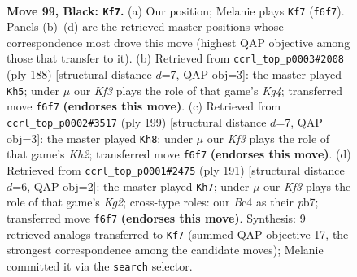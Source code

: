 \documentclass[11pt]{article}
\begin{document}
\clearpage

\begin{figure}[p]\centering
\begin{subfigure}{0.46\textwidth}\centering
\resizebox{\linewidth}{!}{%
\newchessgame
\chessboard[
  setfen={8/7K/5k2/5p2/2b2P2/8/8/8 b - - 13 99},
  showmover=false,
  pgfstyle=straightmove, color=movearrow, markmove={f6-f7}
]}
\caption{}
\end{subfigure}\hfill
\begin{subfigure}{0.46\textwidth}\centering
\resizebox{\linewidth}{!}{%
\newchessgame
\chessboard[
  setfen={3r4/1B4k1/7p/8/6KP/8/8/8 w - - 66 95},
  showmover=false,
  pgfstyle=straightmove, color=movearrow, markmove={g4-h5}
]}
\caption{}
\end{subfigure}
\\[4pt]
\begin{subfigure}{0.46\textwidth}\centering
\resizebox{\linewidth}{!}{%
\newchessgame
\chessboard[
  setfen={5K2/7k/6p1/8/2B4P/7P/8/8 b - - 44 100},
  showmover=false,
  pgfstyle=straightmove, color=movearrow, markmove={h7-h8}
]}
\caption{}
\end{subfigure}\hfill
\begin{subfigure}{0.46\textwidth}\centering
\resizebox{\linewidth}{!}{%
\newchessgame
\chessboard[
  setfen={8/1P2K1k1/6p1/8/8/8/8/8 b - - 0 96},
  showmover=false,
  pgfstyle=straightmove, color=movearrow, markmove={g7-h7}
]}
\caption{}
\end{subfigure}
\caption{\textbf{Move 99, Black: \texttt{Kf7}.} (a) Our position; Melanie plays \texttt{Kf7} (\texttt{f6f7}). Panels (b)--(d) are the retrieved master positions whose correspondence most drove this move (highest QAP objective among those that transfer to it). (b) Retrieved from \texttt{ccrl\_top\_p0003\#2008} (ply 188) [structural distance $d$=7, QAP obj=3]: the master played \texttt{Kh5}; under $\mu$ our \emph{Kf3} plays the role of that game's \emph{Kg4}; transferred move \texttt{f6f7} \textbf{(endorses this move)}. (c) Retrieved from \texttt{ccrl\_top\_p0002\#3517} (ply 199) [structural distance $d$=7, QAP obj=3]: the master played \texttt{Kh8}; under $\mu$ our \emph{Kf3} plays the role of that game's \emph{Kh2}; transferred move \texttt{f6f7} \textbf{(endorses this move)}. (d) Retrieved from \texttt{ccrl\_top\_p0001\#2475} (ply 191) [structural distance $d$=6, QAP obj=2]: the master played \texttt{Kh7}; under $\mu$ our \emph{Kf3} plays the role of that game's \emph{Kg2}; cross-type roles: our \emph{B}c4 as their \emph{p}b7; transferred move \texttt{f6f7} \textbf{(endorses this move)}. Synthesis: 9 retrieved analogs transferred to \texttt{Kf7} (summed QAP objective 17, the strongest correspondence among the candidate moves); Melanie committed it via the \texttt{search} selector.}
\label{fig:thought-m197}
\end{figure}
\end{document}
